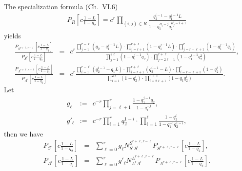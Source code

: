 \documentclass[hyper,letterpaper]{JHEP3}
\begin{document}
%
%
The specialization formula
\cite{McD}(Ch.\ VI.6) %
\begin{eqnarray}
P_R\left[ c\frac{1-L}{1-q_2} \right]
=
c^r
\prod_{(i,j)\in R}
\frac{
q_2^{i-1} - q_1^{j-1} L
}{
1-q_1^{R_i-j} q_2^{R^t_j-i+1}
}
\end{eqnarray}
yields
\begin{eqnarray}
\frac{
P_{S^{r+\ell,r-\ell}}\left[ c\frac{1-L}{1-q_2} \right]
}
{
P_{S^r}\left[ c\frac{1-L}{1-q_2} \right]
}
&=&
c^r
\frac{
\prod_{j=1}^{r-\ell} ( q_2-q_1^{j-1}L )
\cdot
\prod_{j=r+1}^{r+\ell} ( 1-q_1^{j-1}L )
\cdot
\prod_{j=r-\ell+1}^{r}( 1-q_1^{j-1}q_2 )
}{
\prod_{j=1}^{2\ell} ( 1-q_1^{j-1}q_2 )
\cdot
\prod_{j=2\ell+1}^{r+\ell}( 1-q_1^{j-1}q_2^2 )
}
,
\nonumber \\
\frac{
P_{\Lambda^{r+\ell,n-\ell}}\left[ c\frac{1-L}{1-q_2} \right]
}{
P_{\Lambda^r}\left[ c\frac{1-L}{1-q_2} \right]
}
&=&
c^r
\frac{
\prod_{i=1}^{r-\ell} ( q_2^{i-1}-q_1L )
\cdot
\prod_{i=r+1}^{r+\ell} ( q_2^{i-1}-L )
\cdot
\prod_{i=r-\ell+1}^{r}( 1-q_2^i )
}{
\prod_{i=1}^{2\ell} ( 1-q_2^i )
\cdot
\prod_{i=2\ell+1}^{r+\ell}( 1-q_1q_2^i )
}
.
\nonumber
\end{eqnarray}
%
%
Let
\begin{eqnarray}
g_\ell
&:=&
c^{-r} \prod_{j=\ell+1}^{r}\frac{1-q_1^{j-1}q_2}{1-q_1^{-j} }
,
\\
g'_\ell
&:=&
c^{-r} \prod_{i=1}^r q_2^{1-i}
\cdot
\prod_{i=1}^\ell\frac{ 1-q_2^{i}}{ 1-q_1^{-1}q_2^{1-i} }
,
\end{eqnarray}
then we have
\\
\begin{eqnarray}
P_{S^{r}}\left[ c\frac{1-L}{1-q_2} \right]
&=&
\sum_{\ell=0}^r
g_{\ell}
N^{S^{r+\ell,r-\ell}}_{S^rS^r}
P_{S^{r+\ell,r-\ell}}\left[ c\frac{1-L}{1-q_2} \right]
,
\label{eq:PropRow}%
\\
P_{\Lambda^r}\left[ c\frac{1-L}{1-q_2} \right]
&=&
\sum_{\ell=0}^r
g'_{\ell}
N^{\Lambda^{r+\ell,r-\ell}}_{\Lambda^r\Lambda^r}
P_{\Lambda^{r+\ell,r-\ell}}\left[ c\frac{1-L}{1-q_2} \right]
.
\label{eq:PropColumn}%
\end{eqnarray}

\end{document}
